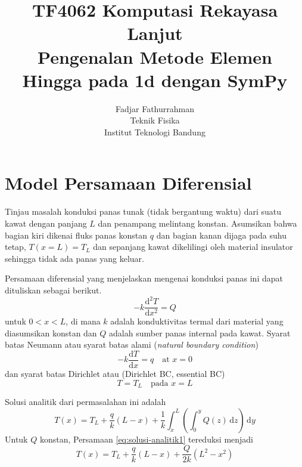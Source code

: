 



\title{%
{\small TF4062 Komputasi Rekayasa Lanjut}\\
Pengenalan Metode Elemen Hingga pada 1d dengan SymPy
}
\author{Fadjar Fathurrahman\\
Teknik Fisika\\
Institut Teknologi Bandung}
\date{}
\maketitle

\section{Model Persamaan Diferensial}

Tinjau masalah konduksi panas tunak (tidak bergantung waktu) dari suatu kawat dengan
panjang $L$ dan penampang melintang konstan. Asumsikan bahwa bagian kiri dikenai fluks
panas konstan $q$ dan bagian kanan dijaga pada suhu tetap, $T(x=L) = T_L$ dan
sepanjang kawat dikelilingi oleh material insulator sehingga tidak ada
panas yang keluar.

Persamaan diferensial yang menjelaskan mengenai konduksi panas ini dapat dituliskan
sebagai berikut.
\begin{equation}
-k \frac{\mathrm{d}^2 T}{\mathrm{d}x^2} = Q
\end{equation}
untuk $0 < x < L$, di mana $k$
adalah konduktivitas termal dari material yang diasumsikan konstan dan
$Q$ adalah sumber panas internal pada kawat.
Syarat batas Neumann atau syarat batas alami (\textit{natural boundary condition})
\begin{equation}
-k\frac{\mathrm{d}T}{\mathrm{d}x} = q \quad \text{at } x = 0
\end{equation}
dan syarat batas Dirichlet atau
 (Dirichlet BC, essential BC)
\begin{equation}
T = T_{L} \quad \text{pada } x = L
\end{equation}

Solusi analitik dari permasalahan ini adalah
\begin{equation}
T(x) = T_{L} + \frac{q}{k}(L - x) + \frac{1}{k} \int_{x}^{L}
\left( \int_{0}^{y} Q(z)\,\mathrm{d}z \right)\,\mathrm{d}y
\label{eq:solusi-analitik1}
\end{equation}
%
Untuk $Q$ konstan, Persamaan \eqref{eq:solusi-analitik1}
tereduksi menjadi
\begin{equation}
T(x) = T_{L} + \frac{q}{k}(L - x) + \frac{Q}{2k}(L^2 - x^2)
\end{equation}


